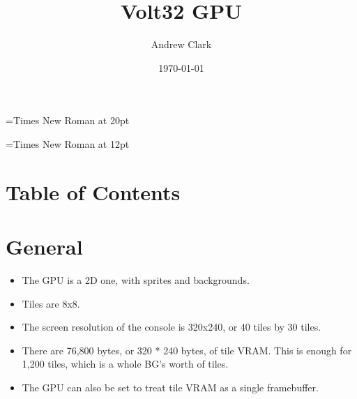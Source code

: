 \documentclass{article}
\makeatletter
\renewcommand\tableofcontents{%
    \@starttoc{toc}%
}
\makeatother
\begin{document}
	\font\titlefont={Times New Roman} at 20pt
	\title{{\titlefont Volt32 GPU}}

	\font\bottomtextfont={Times New Roman} at 12pt
	\date{{\bottomtextfont} \today}
	\author{{\bottomtextfont Andrew Clark}}

	\setmainfont{Times New Roman}
	\setmonofont{Courier New}

	\maketitle

	\newpage



\section{Table of Contents}
	\tableofcontents
	\newpage

\section{General}
	\begin{itemize}
	\item The GPU is a 2D one, with sprites and backgrounds.

	\item Tiles are 8x8.

	\item The screen resolution of the console is 320x240, or 40 tiles by
	30 tiles.

	\item There are 76,800 bytes, or 320 * 240 bytes, of tile VRAM.  This
	is enough for 1,200 tiles, which is a whole BG's worth of tiles.

	\item The GPU can also be set to treat tile VRAM as a single
	framebuffer.
	\end{itemize}
	\newpage
\end{document}
